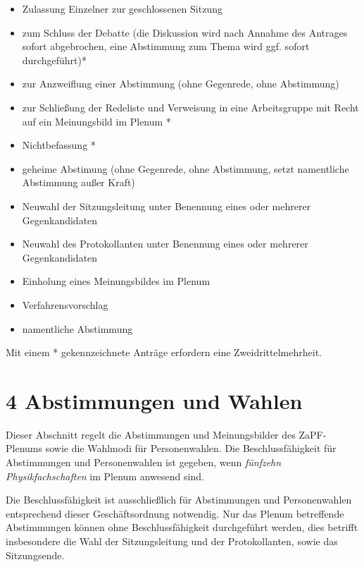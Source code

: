 \documentclass[12pt,oneside]{scrartcl}
\begin{document}
\begin{list}{.}
\begin{itemize}
\item Zulassung Einzelner zur geschlossenen Sitzung

\item zum Schluss der Debatte (die Diskussion wird nach Annahme des
Antrages sofort abgebrochen, eine Abstimmung zum Thema wird ggf.
sofort durchgeführt)*

\item zur Anzweiflung einer Abstimmung (ohne Gegenrede, ohne Abstimmung)

\item zur Schließung der Redeliste und Verweisung in eine Arbeitsgruppe mit
Recht auf ein Meinungsbild im Plenum *

\item Nichtbefassung *

\item geheime Abstimung (ohne Gegenrede, ohne Abstimmung, setzt namentliche
Abstimmung außer Kraft)

\item Neuwahl der Sitzungsleitung unter Benennung eines oder mehrerer Gegenkandidaten

\item Neuwahl des Protokollanten unter Benennung eines oder mehrerer Gegenkandidaten

\item Einholung eines Meinungsbildes im Plenum

\item Verfahrensvorschlag

\item namentliche Abstimmung

\end{itemize}

Mit einem * gekennzeichnete Anträge erfordern eine Zweidrittelmehrheit.
\end{list}


\section{4 Abstimmungen und Wahlen%
  \label{abstimmungen-und-wahlen}%
}

Dieser Abschnitt regelt die Abstimmungen und Meinungsbilder des ZaPF-Plenums
sowie die Wahlmodi für Personenwahlen. Die Beschlussfähigkeit für Abstimmungen
und Personenwahlen ist gegeben, wenn \emph{fünfzehn Physikfachschaften}
im Plenum anwesend sind.

Die Beschlussfähigkeit ist ausschließlich für Abstimmungen und Personenwahlen
entsprechend dieser Geschäftsordnung notwendig.
Nur das Plenum betreffende Abstimmungen können ohne Beschlussfähigkeit
durchgeführt werden, dies betrifft insbesondere die Wahl der Sitzungsleitung und der
Protokollanten, sowie das Sitzungsende.
\end{document}
